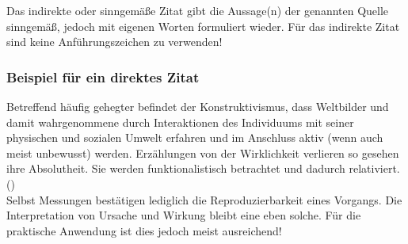 \renewcommand*{\authorOfNextLines}{Helmut Quinz}
Das indirekte oder sinngemäße Zitat gibt die Aussage(n) der genannten Quelle sinngemäß, jedoch mit eigenen Worten formuliert wieder.
Für das indirekte Zitat sind keine Anführungszeichen zu verwenden!
\subsubsection{Beispiel für ein direktes Zitat}
Betreffend häufig gehegter  befindet der Konstruktivismus, 
dass Weltbilder und damit wahrgenommene  durch Interaktionen des Individuums mit seiner physischen und sozialen Umwelt erfahren und 
im Anschluss aktiv (wenn auch meist unbewusst)  werden. 
Erzählungen von der Wirklichkeit verlieren so gesehen ihre Absolutheit.
Sie werden funktionalistisch betrachtet und dadurch relativiert.(\cite[Seiten 68ff]{Simon2013})\\

Selbst Messungen bestätigen lediglich die Reproduzierbarkeit eines Vorgangs. 
Die Interpretation von Ursache und Wirkung bleibt eine eben solche.
Für die praktische Anwendung ist dies jedoch meist ausreichend!
\FloatBarrier